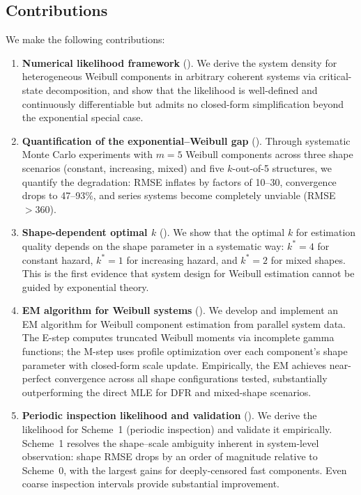 \documentclass[12pt]{article}
\theoremstyle{definition}
\theoremstyle{remark}
\begin{document}
\subsection*{Contributions}

We make the following contributions:

\begin{enumerate}
\item \textbf{Numerical likelihood framework} ().
  We derive the system density for heterogeneous Weibull components
  in arbitrary coherent systems via critical-state decomposition,
  and show that the likelihood is well-defined and continuously
  differentiable but admits no closed-form simplification beyond
  the exponential special case.

\item \textbf{Quantification of the exponential--Weibull gap}
  ().
  Through systematic Monte Carlo experiments with $m = 5$ Weibull
  components across three shape scenarios (constant, increasing,
  mixed) and five $k$-out-of-5 structures, we quantify the
  degradation: RMSE inflates by factors of 10--30, convergence
  drops to 47--93\%, and series systems become completely unviable
  (RMSE $> 360$).

\item \textbf{Shape-dependent optimal $k$}
  ().
  We show that the optimal $k$ for estimation quality depends on
  the shape parameter in a systematic way: $k^* = 4$ for constant
  hazard, $k^* = 1$ for increasing hazard, and $k^* = 2$ for mixed
  shapes.  This is the first evidence that system design for Weibull
  estimation cannot be guided by exponential theory.

\item \textbf{EM algorithm for Weibull systems}
  ().
  We develop and implement an EM algorithm for Weibull component
  estimation from parallel system data.  The E-step computes
  truncated Weibull moments via incomplete gamma functions; the
  M-step uses profile optimization over each component's shape
  parameter with closed-form scale update.  Empirically, the EM
  achieves near-perfect convergence across all shape
  configurations tested, substantially outperforming the direct MLE
  for DFR and mixed-shape scenarios.

\item \textbf{Periodic inspection likelihood and validation}
  ().
  We derive the likelihood for Scheme~1 (periodic inspection) and
  validate it empirically.  Scheme~1 resolves the shape--scale
  ambiguity inherent in system-level observation: shape RMSE drops
  by an order of magnitude relative to Scheme~0, with the largest
  gains for deeply-censored fast components.  Even coarse
  inspection intervals provide substantial improvement.
\end{enumerate}
\end{document}
